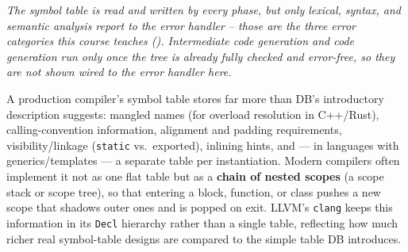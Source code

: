 \documentclass[full-course-notes.tex]{subfiles}
\begin{document}
\begin{center}
\end{center}
\begin{center}
\small\textit{The symbol table is read and written by every phase, but only lexical, syntax,
and semantic analysis report to the error handler -- those are the three error categories this
course teaches (). Intermediate code generation and code generation
run only once the tree is already fully checked and error-free, so they are not shown wired to
the error handler here.}
\end{center}

\begin{enrichment}
A production compiler's symbol table stores far more than DB's introductory description
suggests: mangled names (for overload resolution in C++/Rust), calling-convention information,
alignment and padding requirements, visibility/linkage (\texttt{static} vs.\ exported), inlining
hints, and --- in languages with generics/templates --- a separate table per instantiation.
Modern compilers often implement it not as one flat table but as a \textbf{chain of nested
scopes} (a scope stack or scope tree), so that entering a block, function, or class pushes a
new scope that shadows outer ones and is popped on exit. LLVM's \texttt{clang} keeps this
information in its \texttt{Decl} hierarchy rather than a single table, reflecting how much richer
real symbol-table designs are compared to the simple table DB introduces.
\end{enrichment}
\end{document}
